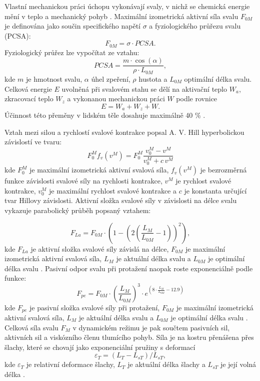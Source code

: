 \documentclass[FZS,DP]{tulthesis}
\begin{document}
Vlastní mechanickou práci úchopu vykonávají svaly, v nichž se chemická energie mění v teplo a mechanický pohyb \cite{Benes2022}. Maximální izometrická aktivní síla svalu $F_{0M}$ je definována jako součin specifického napětí $\sigma$ a fyziologického průřezu svalu (PCSA):
\begin{equation}
    F_{0M}=\sigma\cdot PCSA .
\end{equation}
Fyziologický průřez lze vypočítat ze vztahu:
\begin{equation}
PCSA = \frac{m \cdot \cos(\alpha)}{\rho \cdot L_{0M}},
\end{equation}
kde $m$ je hmotnost svalu, $\alpha$ úhel zpeření, $\rho$ hustota a $L_{0M}$ optimální délka svalu. Celková energie $E$ uvolněná při svalovém stahu se dělí na aktivační teplo $W_a$, zkracovací teplo $W_z$ a vykonanou mechanickou práci $W$ podle rovnice 
\begin{equation}
    E = W_a + W_z + W .
\end{equation} 
Účinnost této přeměny v lidském těle dosahuje maximálně 40 \% \cite{Capek2018}.

Vztah mezi silou a rychlostí svalové kontrakce popsal A. V. Hill hyperbolickou závislostí ve tvaru:
\begin{equation}
F_0^M f_v(v^M) = F_0^M \frac{v_0^M - v^M}{v_0^M + c\,v^M}
\end{equation}
kde $F_0^M$ je maximální izometrická aktivní svalová síla,
$f_v(v^M)$ je bezrozměrná funkce závislosti svalové síly na rychlosti kontrakce,
$v^M$ je rychlost svalové kontrakce, $v_0^M$ je maximální rychlost svalové kontrakce
a $c$ je konstanta určující tvar Hillovy závislosti.
Aktivní složka svalové síly v závislosti na délce svalu vykazuje parabolický průběh popsaný vztahem:

\begin{equation}
F_{La} = F_{0M} \cdot
\left(1 - \left(2\left(\frac{L_M}{L_{0M}} - 1\right)\right)^2\right),
\end{equation}
kde $F_{La}$ je aktivní složka svalové síly závislá na délce, $F_{0M}$ je maximální izometrická aktivní svalová síla, $L_M$ je aktuální délka svalu a $L_{0M}$ je  optimální délka svalu \cite{Capek2018}.
Pasivní odpor svalu při protažení naopak roste exponenciálně podle funkce:
\begin{equation}
F_{pe} = F_{0M} \cdot
\left(\frac{L_M}{L_{0M}}\right)^3 \cdot
e^{\left(8 \cdot \frac{L_M}{L_{0M}} - 12.9\right)}
\end{equation}
kde $F_{pe}$ je pasivní složka svalové síly při protažení,
$F_{0M}$ je maximální izometrická aktivní svalová síla, $L_M$ je aktuální délka svalu a $L_{0M}$ je optimální délka svalu \cite{Capek2018}.
Celková síla svalu $F_M$ v dynamickém režimu je pak součtem pasivních sil, aktivních sil a viskózního členu tlumícího pohyb. Síla je na kostru přenášena přes šlachy, které se chovají jako exponenciální pružiny s deformací 
\begin{equation}
    \varepsilon_T = (L_T - L_{sT}) / L_{sT},
\end{equation} 
kde $\varepsilon_T$ je
relativní deformace šlachy, $L_T$ je aktuální délka šlachy a $L_{sT}$
je její volná délka \cite{Capek2018}.
\end{document}
